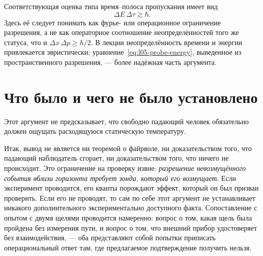 Соответствующая оценка типа время–полоса пропускания имеет вид
\begin{equation}
\Delta E\,\Delta\tau\gtrsim\hbar.
\end{equation}
Здесь её следует понимать как фурье- или операционное ограничение разрешения, а не как операторное соотношение неопределённостей того же статуса, что и \(\Delta x\,\Delta p\geq\hbar/2\). В лекции неопределённость времени и энергии привлекается эвристически; уравнение~\eqref{eq:l05-probe-energy}, выведенное из пространственного разрешения, — более надёжная часть аргумента.

\begin{classroomqa}
\end{classroomqa}

\enlargethispage{2\baselineskip}
\section{Что было и чего не было установлено}

Этот аргумент не предсказывает, что свободно падающий человек обязательно должен ощущать расходящуюся статическую температуру.

\begin{classroomqa}
\end{classroomqa}

Итак, вывод не является ни теоремой о файрволе, ни доказательством того, что падающий наблюдатель сгорает, ни доказательством того, что ничего не происходит. Это ограничение на проверку извне: \emph{разрешение невозмущённого события вблизи горизонта требует зонда, который его возмущает}.
Если эксперимент проводится, его кванты порождают эффект, который он был призван проверить. Если его не проводят, то сам по себе этот аргумент не устанавливает никакого дополнительного экспериментально доступного факта. Сопоставление с опытом с двумя щелями проводится намеренно: вопрос о том, какая щель была пройдена без измерения пути, и вопрос о том, что внешний прибор удостоверяет без взаимодействия, — оба представляют собой попытки приписать операциональный ответ там, где предлагаемое подтверждение получить нельзя.